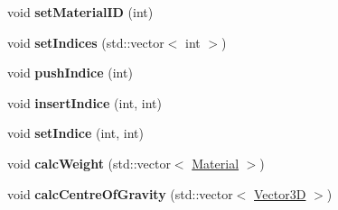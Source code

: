 \begin{DoxyCompactItemize}
\item 
void {\bfseries set\+Material\+ID} (int)\hypertarget{class_cell_aff698048fe244dce00acf341428b5d12}{}\label{class_cell_aff698048fe244dce00acf341428b5d12}

\item 
void {\bfseries set\+Indices} (std\+::vector$<$ int $>$)\hypertarget{class_cell_a9af52dac7c4d4f01791fd0ad5f7b8125}{}\label{class_cell_a9af52dac7c4d4f01791fd0ad5f7b8125}

\item 
void {\bfseries push\+Indice} (int)\hypertarget{class_cell_a93dd64907a9608f6131e1042dfef16d1}{}\label{class_cell_a93dd64907a9608f6131e1042dfef16d1}

\item 
void {\bfseries insert\+Indice} (int, int)\hypertarget{class_cell_a569d618040b18f6b80bcc74ac2d155c2}{}\label{class_cell_a569d618040b18f6b80bcc74ac2d155c2}

\item 
void {\bfseries set\+Indice} (int, int)\hypertarget{class_cell_ab32d149f16f70270f01762ee79f0712c}{}\label{class_cell_ab32d149f16f70270f01762ee79f0712c}

\item 
void {\bfseries calc\+Weight} (std\+::vector$<$ \hyperlink{class_material}{Material} $>$)\hypertarget{class_cell_af458a98ed21d80438afac6a10f26f13c}{}\label{class_cell_af458a98ed21d80438afac6a10f26f13c}

\item 
void {\bfseries calc\+Centre\+Of\+Gravity} (std\+::vector$<$ \hyperlink{class_vector3_d}{Vector3D} $>$)\hypertarget{class_cell_a33ee01b65c3615852f0fb9f4d9d95d13}{}\label{class_cell_a33ee01b65c3615852f0fb9f4d9d95d13}

\end{DoxyCompactItemize}
